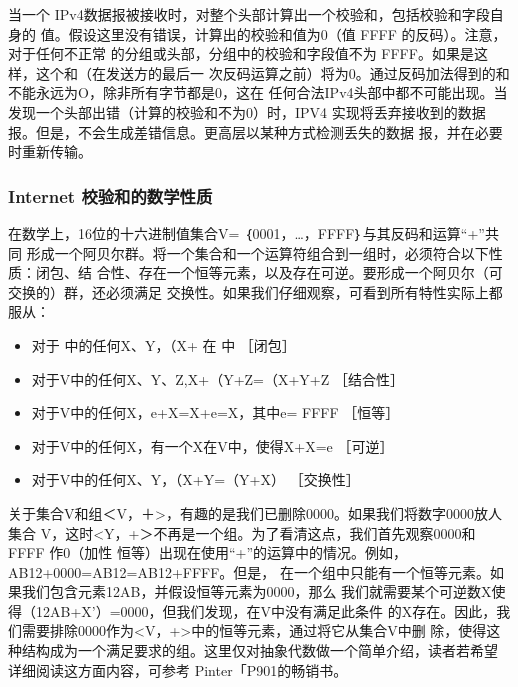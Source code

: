 当一个 IPv4数据报被接收时，对整个头部计算出一个校验和，包括校验和字段自身的
值。假设这里没有错误，计算出的校验和值为0（值 FFFF 的反码）。注意，对于任何不正常
的分组或头部，分组中的校验和字段值不为 FFFF。如果是这样，这个和（在发送方的最后一
次反码运算之前）将为0。通过反码加法得到的和不能永远为O，除非所有字节都是0，这在
任何合法IPv4头部中都不可能出现。当发现一个头部出错（计算的校验和不为0）时，IPV4
实现将丢弃接收到的数据报。但是，不会生成差错信息。更高层以某种方式检测丢失的数据
报，并在必要时重新传输。

\subsubsection{Internet 校验和的数学性质}
在数学上，16位的十六进制值集合V= ｛0001，\dots，FFFF｝与其反码和运算“+”共同
形成一个阿贝尔群。将一个集合和一个运算符组合到一组时，必须符合以下性质：闭包、结
合性、存在一个恒等元素，以及存在可逆。要形成一个阿贝尔（可交换的）群，还必须满足
交换性。如果我们仔细观察，可看到所有特性实际上都服从：

\begin{itemize}
    \item 对于 中的任何X、Y，（X+ 在 中           ［闭包］
    \item 对于V中的任何X、Y、Z,X+（Y+Z=（X+Y+Z    ［结合性］
    \item 对于V中的任何X，e+X=X+e=X，其中e= FFFF      ［恒等］
    \item 对于V中的任何X，有一个X在V中，使得X+X=e         ［可逆］
    \item 对于V中的任何X、Y，（X+Y=（Y+X）                ［交换性］
\end{itemize}

关于集合V和组＜V，＋>，有趣的是我们已删除0000。如果我们将数字0000放人集合
V，这时<Y，+＞不再是一个组。为了看清这点，我们首先观察0000和 FFFF 作0（加性
恒等）出现在使用“+”的运算中的情况。例如，AB12+0000=AB12=AB12+FFFF。但是，
在一个组中只能有一个恒等元素。如果我们包含元素12AB，并假设恒等元素为0000，那么
我们就需要某个可逆数X使得（12AB+X'）=0000，但我们发现，在V中没有满足此条件
的X存在。因此，我们需要排除0000作为<V，+>中的恒等元素，通过将它从集合V中删
除，使得这种结构成为一个满足要求的组。这里仅对抽象代数做一个简单介绍，读者若希望
详细阅读这方面内容，可参考 Pinter「P901的畅销书。

